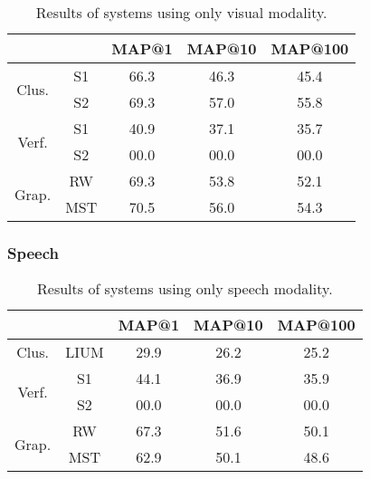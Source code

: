 \begin{table}[tb]
\centering
\begin{tabular}{|c|c|c|c|c|}
\cline{3-5}
 \multicolumn{2}{c|}{ }	& MAP@1  & MAP@10 & MAP@100  \\ \hline
 \multirow{2}{*}{Clus.} & S1	& 66.3   & 46.3   & 45.4 \\ \cline{2-5}
 						& S2  	& 69.3   & 57.0   & 55.8 \\ \hline

 \multirow{2}{*}{Verf.} & S1	& 40.9   & 37.1   & 35.7 \\ \cline{2-5}
 						& S2 	& 00.0   & 00.0   & 00.0 \\ \hline

 \multirow{2}{*}{Grap.} & RW 	& 69.3   & 53.8   & 52.1 \\ \cline{2-5}
 						& MST 	& 70.5   & 56.0   & 54.3 \\ \hline 										
\end{tabular}
\vspace*{-2mm}
\caption{Results of systems using only visual modality.}
\vspace*{-2mm}
\label{tab:face_result}
\end{table}

\subsubsection{Speech}

\begin{table}[tb]
\centering
\begin{tabular}{|c|c|c|c|c|}
\cline{3-5}
 \multicolumn{2}{c|}{ }	& MAP@1 & MAP@10 & MAP@100  \\ \hline
 \multirow{1}{*}{Clus.} & LIUM	& 29.9   & 26.2   & 25.2 \\ \cline{1-5}

 \multirow{2}{*}{Verf.} & S1	& 44.1   & 36.9   & 35.9 \\ \cline{2-5}
 						& S2 	& 00.0   & 00.0   & 00.0 \\ \hline

 \multirow{2}{*}{Grap.} & RW 	& 67.3 	 &  51.6  & 50.1 \\ \cline{2-5}
 						& MST 	& 62.9   &  50.1  & 48.6 \\ \hline 								
\end{tabular}
\vspace*{-2mm}
\caption{Results of systems using only speech modality.}
\vspace*{-2mm}
\label{tab:speech_result}
\end{table}

